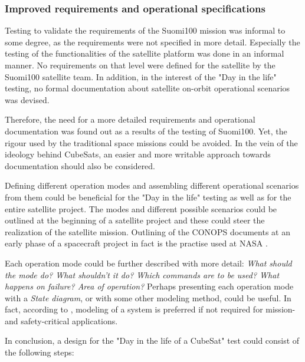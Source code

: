\documentclass[english,12pt,a4paper,pdftex,elec,utf8]{aaltothesis}
\begin{document}
\subsubsection{Improved requirements and operational specifications}
Testing to validate the requirements of the Suomi100 mission was informal to some degree, as the requirements were not specified in more detail. Especially the testing of the functionalities of the satellite platform was done in an informal manner. No requirements on that level were defined for the satellite by the Suomi100 satellite team. In addition, in the interest of the "Day in the life" testing, no formal documentation about satellite on-orbit operational scenarios was devised.\par 
Therefore, the need for a more detailed requirements and operational documentation was found out as a results of the testing of Suomi100. Yet, the rigour used by the traditional space missions could be avoided. In the vein of the ideology behind CubeSats, an easier and more writable approach towards documentation should also be considered.\par 
Defining different operation modes and assembling different operational scenarios from them could be beneficial for the "Day in the life" testing as well as for the entire satellite project. The modes and different possible scenarios could be outlined at the beginning of a satellite project and these could steer the realization of the satellite mission. Outlining of the CONOPS documents at an early phase of a spacecraft project in fact is the practise used at NASA \cite{nasahandbook}.\par 
Each operation mode could be further described with more detail: \textit{What should the mode do? What shouldn't it do? Which commands are to be used? What happens on failure? Area of operation?} Perhaps presenting each operation mode with a \textit{State diagram}, or with some other modeling method, could be useful. In fact, according to \cite{embeddedsofteng}, modeling of a system is preferred if not required for mission- and safety-critical applications.\par 
In conclusion, a design for the "Day in the life of a CubeSat" test could consist of the following steps:
\end{document}
